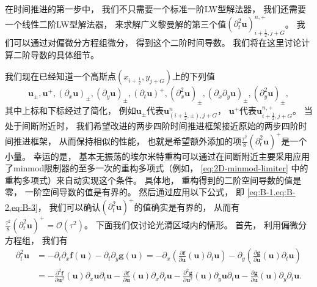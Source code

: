 在时间推进的第一步中，
我们不只需要一个标准一阶LW型解法器，
我们还需要一个线性二阶LW型解法器，
来求解广义黎曼解的第三个值$\left({\partial_{t}^2}{\bm{u}}\right)_{i+\frac{1}{2},j+G}^{n, +}$。
我们可以通过对偏微分方程组微分，
得到这个二阶时间导数。
我们将在这里讨论计算二阶导数的具体细节。

我们现在已经知道一个高斯点$(x_{i+\frac{1}{2}},y_{j+G})$上的下列值
\begin{equation}
  {\bm{u}}_\pm, {\bm{u}}^+,\left({\partial_{x}}{\bm{u}}\right)_\pm, \left({\partial_{y}}{\bm{u}}\right)_\pm, \left({\partial_{t}} {\bm{u}}\right)^+,
  \left({\partial_{x}^2}{\bm{u}}\right)_\pm, \left({\partial_{x}}{\partial_{y}}{\bm{u}}\right)_\pm, \left({\partial_{y}^2}{\bm{u}}\right)_\pm,
\end{equation}
其中上标和下标经过了简化，
例如${\bm{u}}_\pm$代表${\bm{u}}_{(i+\frac{1}{2},\pm), j+G}^n$，
${\bm{u}}^+$代表${\bm{u}}_{i+\frac{1}{2}, j+G}^{n,+}$。
当处于间断附近时，
我们希望改进的两步四阶时间推进框架接近原始的两步四阶时间推进框架，
从而保持相似的性能，
也就是希望额外添加的项$\frac{\tau^2}{8}\left({\partial_{t}^2} \bm{u}\right)^+$是一个小量。
幸运的是，
基本无振荡的埃尔米特重构可以通过在间断附近主要采用应用了minmod限制器的至多一次的重构多项式（例如，
\cref{eq:2D-minmod-limiter} 中的重构多项式）来自动实现这个条件。
具体地，
重构得到的二阶空间导数的值是零，
一阶空间导数的值是有界的。
然后通过应用以下公式，
即 \cref{eq:B-1,eq:B-2,eq:B-3}，
我们可以确认$\left({\partial_{t}^2} \bm{u}\right)^+$的值确实是有界的，
从而有$\frac{\tau^2}{8}\left({\partial_{t}^2} \bm{u}\right)^+=\mathcal{O}(\tau^2)$。
下面我们仅讨论光滑区域内的情形。
首先，
利用偏微分方程组，
我们有
\begin{equation}
  \begin{aligned}
    {\partial_{t}^2} {\bm{u}}
     & = -{\partial_{t}}{\partial_{x}}{\bm{f}}({\bm{u}})-{\partial_{t}}{\partial_{y}}{\bm{g}}({\bm{u}}) = -{\partial_{x}} \left(\frac{\partial{\bm{f}}}{\partial{\bm{u}}}({\bm{u}}){\partial_{t}}{\bm{u}}\right)-{\partial_{y}}\left(\frac{\partial{\bm{g}}}{\partial{\bm{u}}}({\bm{u}}) {\partial_{t}}{\bm{u}}\right)                                                                                       \\
     & = -\frac{\partial^2{\bm{f}}}{\partial{\bm{u}}^2}({\bm{u}}) {\partial_{x}}{\bm{u}} {\partial_{t}}{\bm{u}} -\frac{\partial{\bm{f}}}{\partial{\bm{u}}}({\bm{u}}) {\partial_{x}}{\partial_{t}}{\bm{u}} -\frac{\partial^2{\bm{g}}}{\partial{\bm{u}}^2}({\bm{u}}) {\partial_{y}}{\bm{u}} {\partial_{t}}{\bm{u}} - \frac{\partial{\bm{g}}}{\partial{\bm{u}}}({\bm{u}}){\partial_{y}}{\partial_{t}}{\bm{u}}.
  \end{aligned}
\end{equation}
